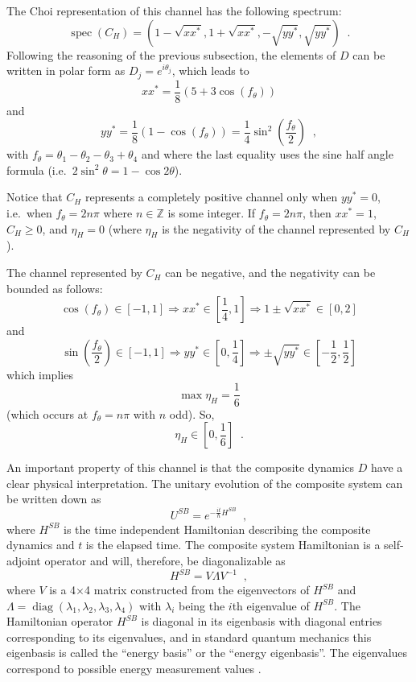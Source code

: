 The Choi representation of this channel has the following spectrum:
$$
\operatorname{spec}(C_H) = \left( 1 - \sqrt{x x^*},1 + \sqrt{x x^*}, -\sqrt{y y^*},\sqrt{y y^*}\right)\;\;.
$$
Following the reasoning of the previous subsection, the elements of $D$ can be written in polar form as $D_j = e^{i \theta_j}$, which leads to
$$
xx^* = \frac{1}{8} \left(5 + 3\cos{\left(f_\theta\right)}\right)
$$
and
$$
yy^* = \frac{1}{8}\left( 1 - \cos{\left(f_\theta\right)} \right) = \frac{1}{4} \sin^2{\left(\frac{f_\theta}{2}\right)}\;\;,
$$
with $f_\theta = \theta_1 - \theta_2 - \theta_3 + \theta_4 $ and where the last equality uses the sine half angle formula (i.e.\ $2 \sin^2\theta = 1 - \cos 2\theta$).

Notice that $C_H$ represents a completely positive channel only when $yy^*=0$, i.e.\ when $f_\theta = 2n\pi$ where $n\in\mathbb{Z}$ is some integer.  If $f_\theta = 2n\pi$, then $xx^*=1$, $C_H \ge 0$, and $\eta_H=0$ (where $\eta_H$ is the negativity of the channel represented by $C_H$).  

The channel represented by $C_H$ can be negative, and the negativity can be bounded as follows: 
$$
\cos(f_\theta)\in[-1,1]\Rightarrow xx^*\in\left[\frac{1}{4},1\right]\Rightarrow 1\pm \sqrt{xx^*}\in[0,2]
$$
and
$$
\sin\left(\frac{f_\theta}{2}\right)\in[-1,1]\Rightarrow yy^*\in\left[0,\frac{1}{4}\right]\Rightarrow\pm\sqrt{yy^*}\in\left[-\frac{1}{2},\frac{1}{2}\right]
$$
which implies
$$
\max \eta_H = \frac{1}{6}
$$
(which occurs at $f_\theta = n\pi$ with $n$ odd).  So,
$$
\eta_H \in \left[0,\frac{1}{6}\right]\;\;.
$$

An important property of this channel is that the composite dynamics $D$ have a clear physical interpretation.  The unitary evolution of the composite system can be written down as
$$
U^{SB} = e^{-\frac{it}{\hbar} H^{SB}}\;\;,
$$
where $H^{SB}$ is the time independent Hamiltonian describing the composite dynamics and $t$ is the elapsed time.  The composite system Hamiltonian is a self-adjoint operator and will, therefore, be diagonalizable as
$$
H^{SB} = V\Lambda V^{-1}\;\;,
$$    
where $V$ is a 4$\times$4 matrix constructed from the eigenvectors of $H^{SB}$ and $\Lambda=\operatorname{diag}(\lambda_1,\lambda_2,\lambda_3,\lambda_4)$ with $\lambda_i$ being the $i$th eigenvalue of $H^{SB}$.  The Hamiltonian operator $H^{SB}$ is diagonal in its eigenbasis with diagonal entries corresponding to its eigenvalues, and in standard quantum mechanics this eigenbasis is called the ``energy basis'' or the ``energy eigenbasis''.  The eigenvalues correspond to possible energy measurement values \cite{Landau1977}.  

